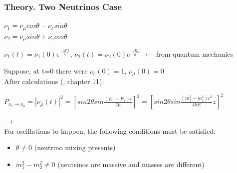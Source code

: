 \begin{frame}\frametitle{Theory. Two Neutrinos Case}
  \scriptsize
  \begin{center}
  $\nu_1=\nu_{\mu}cos\theta-\nu_esin\theta$\\
  $\nu_2=\nu_{\mu}sin\theta+\nu_ecos\theta$\\
  \end{center}
  \begin{center}
  $\nu_1(t)=\nu_1(0)e^{\frac{-iE_1t}{\hbar}}$, $\nu_2(t)=\nu_2(0)e^{\frac{-iE_2t}{\hbar}}$ $\leftarrow$ from quantum mechanics\\
  \end{center}
  Suppose, at t=0 there were $\nu_e(0)=1$, $\nu_\mu(0)=0$\\
  After calculations (\cite{ref_Griffiths}, chapter 11): 
  \begin{center}
  $P_{\nu_e \rightarrow \nu_\mu}=|\nu_\mu(t)|^2=[{sin2\theta}sin{\frac{(E_1-E_2)t}{2\hbar}}]^2=[{sin2\theta}sin{\frac{(m_1^2-m_2^2)c^3}{4\hbar{E}}z}]^2$\\  
  \end{center}
  \large $\rightarrow$\\
  \scriptsize
  For oscillations to happen, the following conditions must be satisfied:
  \begin{itemize}
     \item $\theta \neq 0$ (neutrino mixing presents)
     \item $m_1^2-m_2^2 \neq 0$ (neutrinos are massive and masses are different)
  \end{itemize}
\end{frame}

